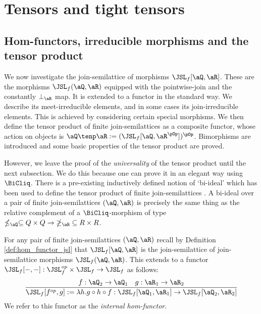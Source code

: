 \documentclass{article}
\begin{document}


\section{Tensors and tight tensors}
\label{sec:tensors}

\subsection{Hom-functors, irreducible morphisms and the tensor product}

We now investigate the join-semilattice of morphisms $\JSL_f[\aQ,\aR]$. These are the morphisms $\JSL_f(\aQ,\aR)$ equipped with the pointwise-join and the constantly $\bot_\aR$ map. It is extended to a functor in the standard way. We describe its meet-irreducible elements, and in some cases its join-irreducible elements. This is achieved by considering certain special morphisms. We then define the tensor product of finite join-semilattices as a composite functor, whose action on objects is $\aQ \tenp \aR := (\JSL_f[\aQ,\aR^{\pOp}])^{\pOp}$. Bimorphisms are introduced and some basic properties of the tensor product are proved.

\smallskip
However, we leave the proof of the \emph{universality} of the tensor product until the next subsection. We do this because one can prove it in an elegant way using $\BiCliq$. There is a pre-existing inductively defined notion of `bi-ideal' which has been used to define the tensor product of finite join-semilattices \cite{GratzerTensorSemilattices2005}. A bi-ideal over a pair of finite join-semilattices $(\aQ,\aR)$ is precisely the same thing as the relative complement of a $\BiCliq$-morphism of type $\nleq_\aQ \subseteq Q \times Q \to \; \ngeq_\aR \; \subseteq R \times R$.



\begin{definition}
\label{def:jsl_internal_hom}
\item
For any pair of finite join-semilattices $(\aQ,\aR)$ recall by Definition \ref{def:hom_functor_jsl} that $\JSL_f[\aQ,\aR]$ is the join-semilattice of join-semilattice morphisms $\JSL_f(\aQ,\aR)$. This  extends to a functor $\JSL_f[-,-] : \JSL_f^{op} \times \JSL_f \to \JSL_f$ as follows:
\[
\dfrac{f : \aQ_2 \to \aQ_1 \quad g : \aR_1 \to \aR_2}
{\JSL_f[f^{op},g] := \lambda h. g \circ h \circ f    : \JSL_f[\aQ_1,\aR_1] \to \JSL_f[\aQ_2,\aR_2] }
\]
We refer to this functor as the \emph{internal hom-functor}. \endbox
\end{definition}
\end{document}
